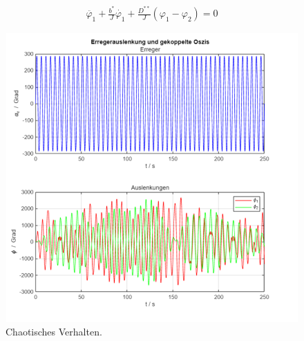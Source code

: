         \begin{align}
            \ddot{\varphi_1}+\frac{b^\ast}{J}\dot{\varphi_1}+\frac{D^{\ast\ast}}{J}(\varphi_1-\varphi_2)=0 
        \end{align}

        \begin{figure}[htbp]
            \centering
            \includegraphics[height=.35\textheight]{Bilder/Kapitel-3/Chaotisches Verhalten.png}
            \caption[Chaotisches Verhalten]{Chaotisches Verhalten.}\label{Chaotisches Verhalten}
        \end{figure}

